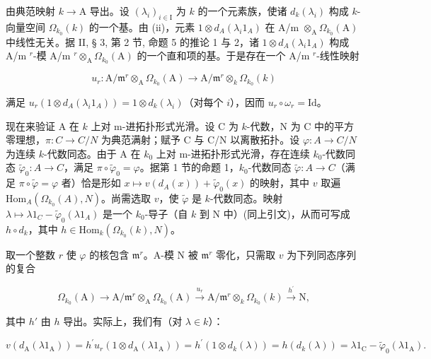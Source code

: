 由典范映射 \(k\to\mathrm{A}\) 导出。设 \((\lambda_{i})_{i\in\mathrm{I}}\) 为 \(k\) 的一个元素族，使诸 \(d_{k}(\lambda_{i})\) 构成 \(k\)-向量空间 \(\Omega_{k_{0}}(k)\) 的一个基。由 (ii)，元素 \(1 \otimes d_{A}(\lambda_{i}1_{A})\) 在 A/m \(\otimes_{\mathrm{A}} \Omega_{k_0}(\mathrm{A})\) 中线性无关。据 II, § 3, 第 2 节, 命题 5 的推论 1 与 2，诸 \(1 \otimes d_{A}(\lambda_{i}1_{A})\) 构成 A/m \(^{r}\)-模 A/m \(^{r} \otimes_{\mathrm{A}} \Omega_{k_0}(\mathrm{A})\) 的一个直和项的基。于是存在一个 A/m \(^{r}\)-线性映射

\[
u _ {r}: \mathrm{A} / \mathfrak {m} ^ {r} \otimes_ {\mathrm{A}} \Omega_ {k _ {0}} (\mathrm{A}) \longrightarrow \mathrm{A} / \mathfrak {m} ^ {r} \otimes_ {k} \Omega_ {k _ {0}} (k)
\]

满足 \(u_r(1 \otimes d_A(\lambda_i 1_A)) = 1 \otimes d_k(\lambda_i)\)（对每个 \(i\)），因而 \(u_r \circ \omega_r = \mathrm{Id}\)。

现在来验证 A 在 \(k\) 上对 m-进拓扑形式光滑。设 C 为 \(k\)-代数，N 为 C 中的平方零理想，\(\pi: C \to C/N\) 为典范满射；赋予 C 与 C/N 以离散拓扑。设 \(\varphi: A \to C/N\) 为连续 \(k\)-代数同态。由于 A 在 \(k_0\) 上对 m-进拓扑形式光滑，存在连续 \(k_0\)-代数同态 \(\tilde{\varphi}_0: A \to C\)，满足 \(\pi \circ \tilde{\varphi}_0 = \varphi\)。据第 1 节的命题 1，\(k_0\)-代数同态 \(\tilde{\varphi}: A \to C\)（满足 \(\pi \circ \tilde{\varphi} = \varphi\) 者）恰是形如 \(x \mapsto v(d_A(x)) + \tilde{\varphi}_0(x)\) 的映射，其中 \(v\) 取遍 \(\mathrm{Hom}_{A}(\Omega_{k_0}(A), N)\)。尚需选取 \(v\)，使 \(\tilde{\varphi}\) 是 \(k\)-代数同态。映射 \(\lambda \mapsto \lambda 1_C - \tilde{\varphi}_0(\lambda 1_A)\) 是一个 \(k_0\)-导子（自 \(k\) 到 N 中）(同上引文)，从而可写成 \(h \circ d_k\)，其中 \(h \in \mathrm{Hom}_k(\Omega_{k_0}(k), N)\)。

取一个整数 \(r\) 使 \(\varphi\) 的核包含 \(\mathfrak{m}^r\)。A-模 N 被 \(\mathfrak{m}^r\) 零化，只需取 \(v\) 为下列同态序列的复合

\[
\Omega_ {k _ {0}} (\mathrm{A}) \longrightarrow \mathrm{A} / \mathfrak {m} ^ {r} \otimes_ {\mathrm{A}} \Omega_ {k _ {0}} (\mathrm{A}) \xrightarrow {u _ {r}} \mathrm{A} / \mathfrak {m} ^ {r} \otimes_ {k} \Omega_ {k _ {0}} (k) \xrightarrow {h ^ {\prime}} \mathrm{N},
\]

其中 \(h'\) 由 \(h\) 导出。实际上，我们有（对 \(\lambda \in k\)）：

\[
v \left(d _ {\mathrm{A}} \left(\lambda 1 _ {\mathrm{A}}\right)\right) = h ^ {\prime} u _ {r} \left(1 \otimes d _ {\mathrm{A}} \left(\lambda 1 _ {\mathrm{A}}\right)\right) = h ^ {\prime} \left(1 \otimes d _ {k} (\lambda)\right) = h \left(d _ {k} (\lambda)\right) = \lambda 1 _ {\mathrm{C}} - \tilde {\varphi} _ {0} \left(\lambda 1 _ {\mathrm{A}}\right).
\]

